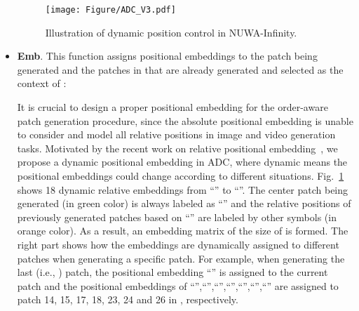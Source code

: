 \documentclass{article}
\begin{document}
\begin{itemize}[leftmargin=*]
\begin{figure}[t!]
    \centering
    \texttt{[image: Figure/ADC\_V3.pdf]}
    \caption{Illustration of dynamic position control in NUWA-Infinity. 
}
    \label{fig:pos}
\end{figure}

\item \textbf{Emb}. This function assigns positional embeddings to the patch  being generated and the patches in  that are already generated and selected as the context of :


It is crucial to design a proper positional embedding for the order-aware patch generation procedure, since the absolute positional embedding \cite{vaswaniAttentionAllYou2017} is unable to consider and model all relative positions in image and video generation tasks. Motivated by the recent work on relative positional embedding~\cite{huangImproveTransformerModels2020,liuVideoSwinTransformer2022}, we propose a dynamic positional embedding in ADC, where dynamic means the positional embeddings could change according to different situations. Fig.~\ref{fig:pos} shows 18 dynamic relative embeddings from ``'' to ``''. The center patch being generated (in {\color{green}green} color) is always labeled as ``'' and the relative positions of previously generated patches based on ``'' are labeled by other symbols (in {\color{orange}orange} color). As a result, an embedding matrix of the size of  is formed. The right part shows how the embeddings are dynamically assigned to different patches when generating a specific patch. For example, when generating the last (i.e., ) patch, the positional embedding ``'' is assigned to the current patch and the positional embeddings of ``'',``'',``'',``'',``'',``'',``'' are assigned to patch 14, 15, 17, 18, 23, 24 and 26 in , respectively.








\end{itemize}
\end{document}
